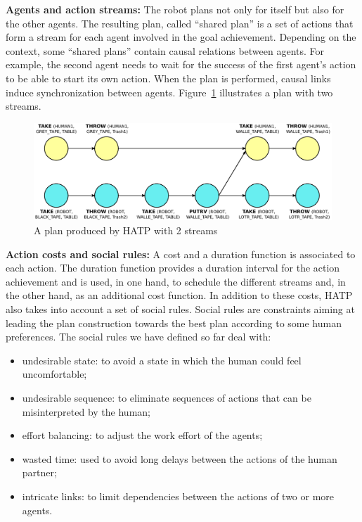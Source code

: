 \documentclass{svmult}
\begin{document}
\vspace{0.3cm}
\noindent
\textbf{Agents and action streams:}
The robot plans not only for itself but also for the other agents. The
resulting plan, called ``shared plan'' is a set of actions that form
a stream for each agent involved in the goal achievement. Depending on
the context, some ``shared plans'' contain causal relations between
agents. For example, the second agent needs to wait for the success of
the first agent's action to be able to start its own action. When the
plan is performed, causal links induce synchronization between
agents. Figure~\ref{plan_hatp1} illustrates a plan with two streams.

\begin{figure}[htbp]
  \centering
  \includegraphics[width=0.95\columnwidth]{./figs/first_plan.pdf}
  \caption{A plan produced by HATP with 2 streams}
  \label{plan_hatp1}
\end{figure}

\vspace{0.3cm}
\noindent
\textbf{Action costs and social rules:}
A cost and a duration function is associated to each action.
The duration function provides a duration interval for the action
achievement and is used, in one hand, to schedule the different
streams and, in the other hand, as an additional cost function.
In addition to these costs, HATP also takes into account a set of social
rules.  Social rules are constraints aiming at leading the plan
construction towards the best plan according to some human
preferences. The social rules we have defined so far deal with:

\begin{itemize}
\item undesirable state: to avoid a state in which the human could
  feel uncomfortable;
\item undesirable sequence: to eliminate sequences of actions that can
  be misinterpreted by the human;
\item effort balancing: to adjust the work effort of the agents;
\item wasted time: used to avoid long delays between the actions of
  the human partner;
\item intricate links: to limit dependencies between the actions of
  two or more agents.
\end{itemize}
\end{document}
